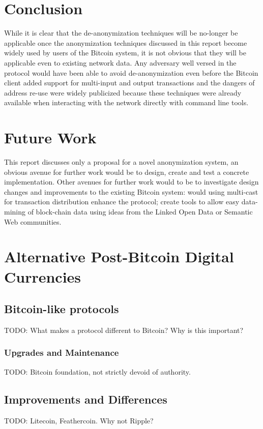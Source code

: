 \section{Conclusion}
While it is clear that the de-anonymization techniques will be no-longer be applicable once the anonymization techniques discussed in this report become widely used by users of the Bitcoin system, it is not obvious that they will be applicable even to existing network data. Any adversary well versed in the protocol would have been able to avoid de-anonymization even before the Bitcoin client\cite{bitcoin-qt} added support for multi-input and output transactions and the dangers of address re-use were widely publicized because these techniques were already available when interacting with the network directly with command line tools.


\section{Future Work}
This report discusses only a proposal for a novel anonymization system, an obvious avenue for further work would be to design, create and test a concrete implementation. Other avenues for further work would to be to investigate design changes and improvements to the existing Bitcoin system: would using multi-cast for transaction distribution enhance the protocol; create tools to allow easy data-mining of block-chain data using ideas from the Linked Open Data or Semantic Web communities.

\section{Alternative Post-Bitcoin Digital Currencies}

\subsection{Bitcoin-like protocols}
TODO: What makes a protocol different to Bitcoin? Why is this important?

\subsubsection{Upgrades and Maintenance}
TODO: Bitcoin foundation, not strictly devoid of authority.

\subsection{Improvements and Differences}
TODO: Litecoin, Feathercoin. Why not Ripple?

